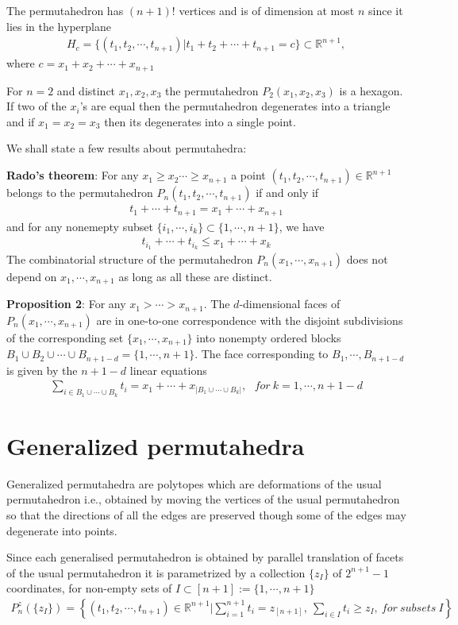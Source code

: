 \documentclass[hidelinks,12pt]{article}
\newcommand{\bea}[1]{\begin{eqnarray}\label{#1} }
\newcommand{\eea}{\end{eqnarray}}
\def\bea{\begin{eqnarray}}
\def\eea{\end{eqnarray}}
\begin{document}
\begin{enumerate}
 The permutahedron has $(n+1)!$ vertices and is of dimension at most $n$ since it lies in the hyperplane 
 \bea
 H_c= \{(t_1,t_2, \cdots, t_{n+1}) | t_1 + t_2 + \cdots + t_{n+1}= c \} \subset \mathbb{R}^{n+1}, \nonumber
 \eea
where $c= x_1+x_2+ \cdots +x_{n+1}$

For $n=2$ and distinct $x_1,x_2, x_3$ the permutahedron $P_2(x_1,x_2, x_3)$ is a hexagon. If two of the $x_i$'s are equal then the permutahedron degenerates into a triangle and if $x_1= x_2 = x_3$ then its degenerates into a single point.

We shall state a few results about permutahedra:

{\bf Rado's theorem}: For any $x_1 \ge x_2  \cdots \ge x_{n+1}$ a point $(t_1,t_2, \cdots, t_{n+1}) \in \mathbb{R}^{n+1}$ belongs to the permutahedron $P_n(t_1,t_2, \cdots, t_{n+1})$ if and only if 
\bea
t_1+ \cdots +t_{n+1} = x_1 +\cdots+ x_{n+1} \nonumber
\eea
and for any nonemepty subset $\{i_1,\cdots,i_k \} \subset \{1,\cdots, n+1 \}$, we have 
\bea
t_{i_1}+ \cdots +t_{i_k} \leq x_1 +\cdots+ x_k \nonumber
\eea
The combinatorial structure of the permutahedron $P_n (x_1, \cdots, x_{n+1}) $ does not depend on $ x_1, \cdots, x_{n+1} $ as long as all these are distinct. 

{\bf Proposition 2}: For any  $x_1> \cdots > x_{n+1} $. The $d$-dimensional faces of $P_n ( x_1, \cdots, x_{n+1 })$ are in one-to-one correspondence with the disjoint subdivisions of the corresponding set $\{x_1,\cdots, x_{n+1 }\}$ into nonempty ordered blocks $B_1 \cup B_2 \cup \cdots \cup B_{n+1-d} =\{1,\cdots,n+1 \}$. The face corresponding to $B_1,\cdots, B_{n+1-d}$ is given by the $n+1-d$ linear equations 
\bea
\sum_{i \in B_1\cup \cdots \cup B_k} t_i = x_1 + \cdots +x_{| B_1 \cup \cdots \cup B_k |}, ~~~ for~ k=1,\cdots,n+1-d \nonumber
\eea 
\section*{Generalized permutahedra}
Generalized permutahedra are polytopes which are deformations of the usual permutahedron i.e., obtained by moving the vertices of the usual permutahedron so that the directions of all the edges are preserved though some of the edges may degenerate into points.

 Since each generalised permutahedron is obtained by parallel translation of facets of the usual permutahedron it is parametrized  by a collection $\{ z_I\}$ of $2^{n+1}-1$ coordinates, for non-empty sets of $I \subset [n+1] := \{1,\cdots,n+1 \}$
 \bea
 P_n^z(\{ z_I \}) = \left \{ (t_1, t_2, \cdots , t_{n+1}) \in \mathbb{R}^{n+1} | \sum_{i=1}^{n+1} t_i = z_{[n+1]},~ \sum_{i \in I} t_i \geq z_I, ~for ~subsets~ I  \right  \} \nonumber
 \eea
 

\end{enumerate}
\end{document}
